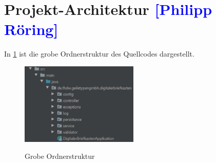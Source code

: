 

\section{Projekt-Architektur \textcolor{blue}{[Philipp Röring]}}

In \cref{fig:root-ordner} ist die grobe Ordnerstruktur des Quellcodes dargestellt.

\begin{figure}[htb]
    \centering
    \begin{minipage}[t]{1\textwidth}
        \caption{Grobe Ordnerstruktur}
        \includegraphics[width=0.5\textwidth]{img/Projekt-root-ordner.png}\\
        \label{fig:root-ordner}
    \end{minipage}
\end{figure}

